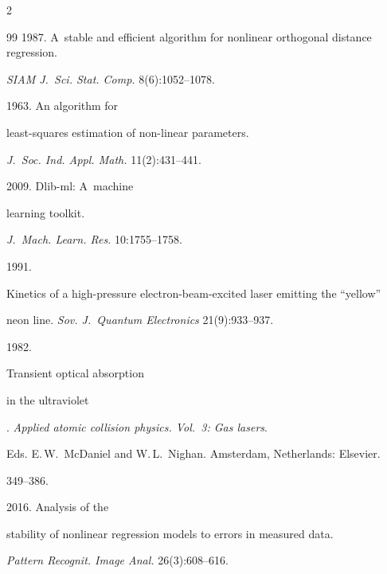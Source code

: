 \begin{multicols}{2}
{{\begin{thebibliography}{99}
  1987. A~stable and efficient algorithm for nonlinear orthogonal distance regression.

\textit{SIAM J.~Sci. Stat.  Comp.} 8(6):1052--1078.




 1963. An algorithm for

  least-squares estimation of non-linear parameters.

\textit{J.~Soc. Ind. Appl.  Math.} 11(2):431--441.




 2009. Dlib-ml: A~machine

  learning toolkit.

\textit{J.~Mach. Learn. Res.} 10:1755--1758.




 1991.

Kinetics of a high-pressure electron-beam-excited laser emitting the ``yellow'' 

neon line. \textit{Sov. J.~Quantum Electronics} 21(9):933--937.




 1982. {Transient optical absorption 

in the ultraviolet}. \textit{Applied atomic collision physics. Vol.~3: Gas lasers}.

Eds. E.\,W.~McDaniel and W.\,L.~Nighan. Amsterdam, Netherlands: Elsevier.

349--386.




 2016. Analysis of the

  stability of nonlinear regression models to errors in measured data.

\textit{Pattern Recognit. Image Anal.} 26(3):608--616.

\end{thebibliography}



 }

 }



\end{multicols}



